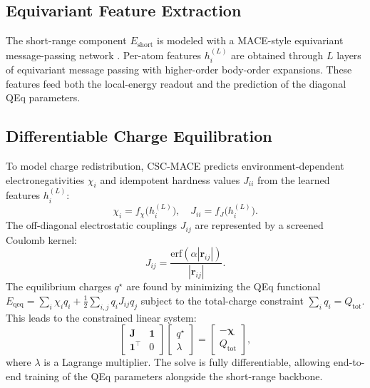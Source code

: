 \subsection{Equivariant Feature Extraction}
The short-range component $E_{\text{short}}$ is modeled with a MACE-style equivariant message-passing network \cite{batatia2022mace}. Per-atom features $h_i^{(L)}$ are obtained through $L$ layers of equivariant message passing with higher-order body-order expansions. These features feed both the local-energy readout and the prediction of the diagonal QEq parameters.

\subsection{Differentiable Charge Equilibration}
To model charge redistribution, CSC-MACE predicts environment-dependent electronegativities $\chi_i$ and idempotent hardness values $J_{ii}$ from the learned features $h_i^{(L)}$:
\begin{equation}
    \chi_i = f_\chi\big(h_i^{(L)}\big), \quad J_{ii} = f_J\big(h_i^{(L)}\big).
\end{equation}
The off-diagonal electrostatic couplings $J_{ij}$ are represented by a screened Coulomb kernel:
\begin{equation}
    J_{ij} = \frac{\text{erf}(\alpha |\mathbf{r}_{ij}|)}{|\mathbf{r}_{ij}|}.
\end{equation}
The equilibrium charges $q^\star$ are found by minimizing the QEq functional $E_{\text{qeq}} = \sum_i \chi_i q_i + \frac{1}{2} \sum_{i,j} q_i J_{ij} q_j$ subject to the total-charge constraint $\sum_i q_i = Q_{\text{tot}}$. This leads to the constrained linear system:
\begin{equation}
    \begin{bmatrix}
        \mathbf{J} & \mathbf{1} \\
        \mathbf{1}^\top & 0
    \end{bmatrix}
    \begin{bmatrix}
        q^\star \\
        \lambda
    \end{bmatrix}
    =
    \begin{bmatrix}
        -\boldsymbol{\chi} \\
        Q_{\text{tot}}
    \end{bmatrix},
    \label{eq:linear_system}
\end{equation}
where $\lambda$ is a Lagrange multiplier. The solve is fully differentiable, allowing end-to-end training of the QEq parameters alongside the short-range backbone.

